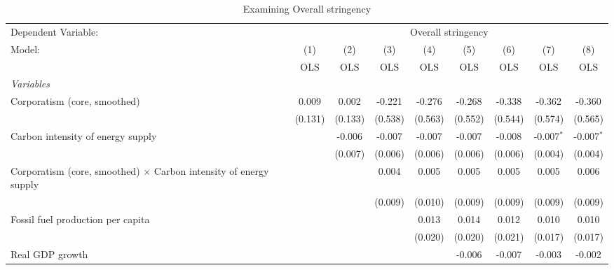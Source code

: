 
\begin{table}[htbp]
   \caption{Examining Overall stringency}
   \centering
   \begin{tabular}{lcccccccc}
      \toprule
      Dependent Variable: & \multicolumn{8}{c}{Overall stringency}\\
      Model:                                                                   & (1)     & (2)     & (3)     & (4)     & (5)     & (6)     & (7)          & (8)\\  
                                                                               &  OLS    & OLS     & OLS     & OLS     & OLS     & OLS     & OLS          & OLS\\  
      \midrule
      \emph{Variables}\\
      Corporatism (core, smoothed)                                             & 0.009   & 0.002   & -0.221  & -0.276  & -0.268  & -0.338  & -0.362       & -0.360\\   
                                                                               & (0.131) & (0.133) & (0.538) & (0.563) & (0.552) & (0.544) & (0.574)      & (0.565)\\   
      Carbon intensity of energy supply                                        &         & -0.006  & -0.007  & -0.007  & -0.007  & -0.008  & -0.007$^{*}$ & -0.007$^{*}$\\   
                                                                               &         & (0.007) & (0.006) & (0.006) & (0.006) & (0.006) & (0.004)      & (0.004)\\   
      Corporatism (core, smoothed) $\times$ Carbon intensity of energy supply  &         &         & 0.004   & 0.005   & 0.005   & 0.005   & 0.005        & 0.006\\   
                                                                               &         &         & (0.009) & (0.010) & (0.009) & (0.009) & (0.009)      & (0.009)\\   
      Fossil fuel production per capita                                        &         &         &         & 0.013   & 0.014   & 0.012   & 0.010        & 0.010\\   
                                                                               &         &         &         & (0.020) & (0.020) & (0.021) & (0.017)      & (0.017)\\   
      Real GDP growth                                                          &         &         &         &         & -0.006  & -0.007  & -0.003       & -0.002\\   

\end{tabular}
\end{table}
